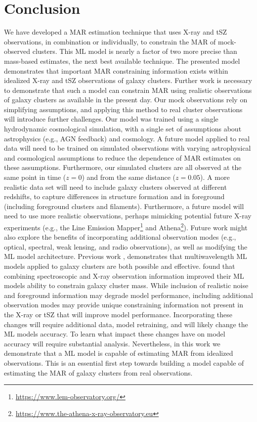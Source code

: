 \section{Conclusion}\label{Ch4_conclusion}
We have developed a MAR estimation technique that uses X-ray and tSZ observations, in combination or individually, to constrain the MAR of mock-observed clusters. This ML model is nearly a factor of two more precise than mass-based estimates, the next best available technique. The presented model demonstrates that important MAR constraining information exists within idealized X-ray and tSZ observations of galaxy clusters. Further work is necessary to demonstrate that such a model can constrain MAR using realistic observations of galaxy clusters as available in the present day. Our mock observations rely on simplifying assumptions, and applying this method to real cluster observations will introduce further challenges. Our model was trained using a single hydrodynamic cosmological simulation, with a single set of assumptions about astrophysics (e.g., AGN feedback) and cosmology. A future model applied to real data will need to be trained on simulated observations with varying astrophysical and cosmological assumptions to reduce the dependence of MAR estimates on these assumptions. Furthermore, our simulated clusters are all observed at the same point in time ($z=0$) and from the same distance ($z=0.05$). A more realistic data set will need to include galaxy clusters observed at different redshifts, to capture differences in structure formation and in foreground (including foreground clusters and filaments). Furthermore, a future model will need to use more realistic observations, perhaps mimicking potential future X-ray experiments (e.g., the Line Emission Mapper\footnote{\url{https://www.lem-observatory.org/}} and Athena\footnote{\url{https://www.the-athena-x-ray-observatory.eu}}). Future work might also explore the benefits of incorporating additional observation modes (e.g., optical, spectral, weak lensing, and radio observations), as well as modifying the ML model architecture. Previous work \cite{Ho_2023}, demonstrates that multiwavelength ML models applied to galaxy clusters are both possible and effective. \cite{Ho_2023} found that combining spectroscopic and X-ray observation information improved their ML models ability to constrain galaxy cluster mass. While inclusion of realistic noise and foreground information may degrade model performance, including additional observation modes may provide unique constraining information not present in the X-ray or tSZ that will improve model performance. Incorporating these changes will require additional data, model retraining, and will likely change the ML models accuracy. To learn what impact these changes have on model accuracy will require substantial analysis. Nevertheless, in this work we demonstrate that a ML model is capable of estimating MAR from idealized observations. This is an essential first step towards building a model capable of estimating the MAR of galaxy clusters from real observations.

